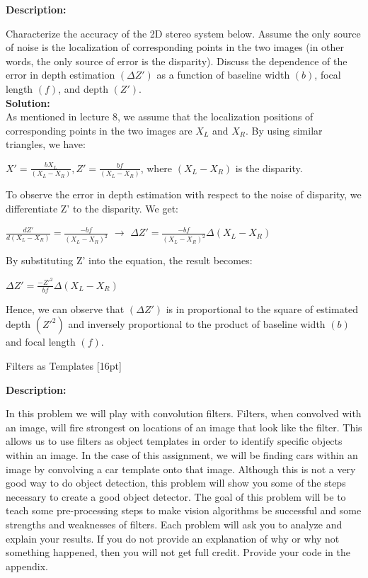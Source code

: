 \documentclass{assignment}
\begin{document}
\begin{problemlist}
\textbf{Description:}

Characterize the accuracy of the 2D stereo system below. Assume the only source of noise is the localization of corresponding points in the two images (in other words, the only source of error is the disparity). Discuss the dependence of the error in depth estimation $(\Delta Z')$ as a function of baseline width $(b)$, focal length $(f)$, and depth $(Z')$.\\
\textbf{Solution:}\\
As mentioned in lecture 8, we assume that the localization positions of corresponding points in the two images are $X_L$ and $X_R$. By using similar triangles, we have:\\
\begin{center}
$X' = \frac{bX_L}{(X_L-X_R)}, Z' =  \frac{bf}{(X_L-X_R)}$, where $(X_L-X_R)$ is the disparity.\\
\end{center}
To observe the error in depth estimation with respect to the noise of disparity, we differentiate Z' to the disparity. We get:\\
\begin{center}
$\frac{dZ'}{d(X_L-X_R)} = \frac{-bf}{(X_L-X_R)^2}$ $\to$ $\Delta Z' = \frac{-bf}{(X_L-X_R)^2} \Delta(X_L-X_R)$\\
\end{center}
By substituting Z' into the equation, the result becomes:\\
\begin{center}
$\Delta Z' = \frac{-Z'^2}{bf} \Delta(X_L-X_R)$\\
\end{center}
Hence, we can observe that $(\Delta Z')$ is in proportional to the square of estimated depth $(Z'^2)$ and inversely proportional to the product of baseline width $(b)$ and focal length $(f)$.




\newpage
\pbitem Filters as Templates [16pt]

\textbf{Description:}

In this problem we will play with convolution filters. Filters, when convolved with an image, will fire strongest on locations of an image that look like the filter. This allows us to use filters as object templates in order to identify specific objects within an image. In the case of this assignment, we will be finding cars within an image by convolving a car template onto that image. Although this is not a very good way to do object detection, this problem will show you some of the steps necessary to create a good object detector. The goal of this problem will be to teach some pre-processing steps to make vision algorithms be successful and some strengths and weaknesses of filters. Each problem will ask you to analyze and explain your results. If you do not provide an explanation of why or why not something happened, then you will not get full credit. Provide your code in the appendix.\\


\end{problemlist}
\end{document}
